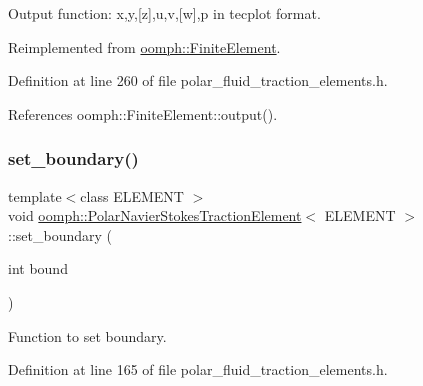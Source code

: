 Output function\+: x,y,\mbox{[}z\mbox{]},u,v,\mbox{[}w\mbox{]},p in tecplot format. 



Reimplemented from \hyperlink{classoomph_1_1FiniteElement_afa9d9b2670f999b43e6679c9dd28c457}{oomph\+::\+Finite\+Element}.



Definition at line 260 of file polar\+\_\+fluid\+\_\+traction\+\_\+elements.\+h.



References oomph\+::\+Finite\+Element\+::output().

\mbox{\label{classoomph_1_1PolarNavierStokesTractionElement_ad014869b40a523b9fe81d8a816e069e2}} 
\subsubsection{\texorpdfstring{set\+\_\+boundary()}{set\_boundary()}}
{\footnotesize\ttfamily template$<$class E\+L\+E\+M\+E\+NT $>$ \\
void \hyperlink{classoomph_1_1PolarNavierStokesTractionElement}{oomph\+::\+Polar\+Navier\+Stokes\+Traction\+Element}$<$ E\+L\+E\+M\+E\+NT $>$\+::set\+\_\+boundary (\begin{DoxyParamCaption}\item[{int}]{bound }\end{DoxyParamCaption})\hspace{0.3cm}{\ttfamily [inline]}}



Function to set boundary. 



Definition at line 165 of file polar\+\_\+fluid\+\_\+traction\+\_\+elements.\+h.

\mbox{\label{classoomph_1_1PolarNavierStokesTractionElement_acf82a8786ed974bf6e3606b7c3f5ad8a}} 
